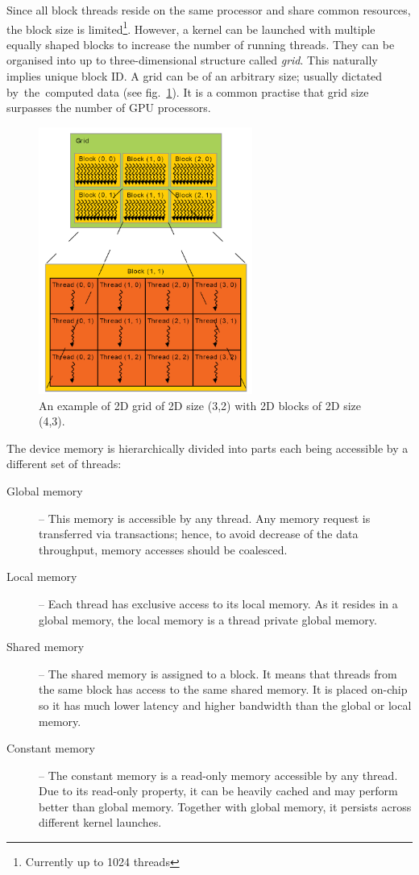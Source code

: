 Since all block threads reside on the same processor and share common resources, the block size is limited\footnote{Currently up to 1024 threads}. However, a kernel can be launched with multiple equally shaped blocks to increase the number of running threads. They can be organised into up to three-dimensional structure called \emph{grid}. This naturally implies unique block ID. A grid can be of an arbitrary size; usually dictated by~the~computed data (see fig.~\ref{fig02:grid}). It is a common practise that grid size surpasses the number of GPU processors.


\begin{figure}\centering
	\includegraphics[width=7cm]{img/grid}
	\caption{An example of 2D grid of 2D size (3,2) with 2D blocks of 2D size (4,3).}
	\label{fig02:grid}
\end{figure}


The device memory is hierarchically divided into parts each being accessible by a different set of threads:

\begin{description}
	\item[Global memory] -- This memory is accessible by any thread. Any memory request is transferred via transactions; hence, to avoid decrease of the data throughput, memory accesses should be coalesced. 
	\item[Local memory] -- Each thread has exclusive access to its local memory. As it resides in a global memory, the local memory is a thread private global memory.
	\item[Shared memory] -- The shared memory is assigned to a block. It means that threads from the same block has access to the same shared memory. It is placed on-chip so it has much lower latency and higher bandwidth than the global or local memory.
	\item[Constant memory] -- The constant memory is a read-only memory accessible by any thread. Due to its read-only property, it can be heavily cached and may perform better than global memory. Together with global memory, it persists across different kernel launches.
\end{description}


